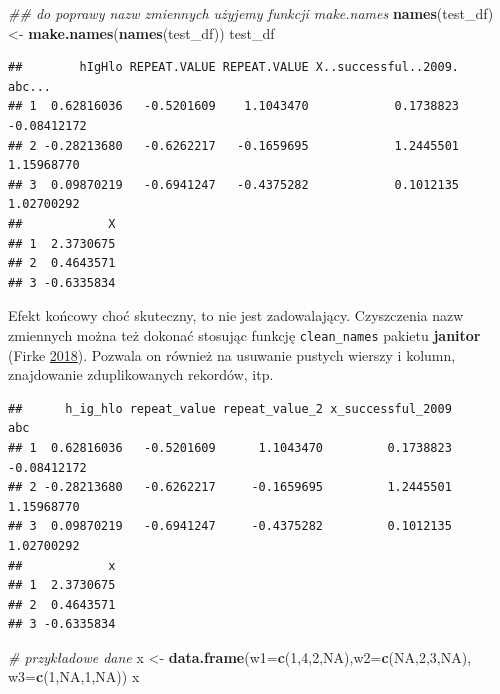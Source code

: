 \documentclass[]{book}
\newenvironment{Shaded}{\begin{snugshade}}{\end{snugshade}}
\newcommand{\CommentTok}[1]{\textcolor[rgb]{0.56,0.35,0.01}{\textit{#1}}}
\newcommand{\DataTypeTok}[1]{\textcolor[rgb]{0.13,0.29,0.53}{#1}}
\newcommand{\DecValTok}[1]{\textcolor[rgb]{0.00,0.00,0.81}{#1}}
\newcommand{\KeywordTok}[1]{\textcolor[rgb]{0.13,0.29,0.53}{\textbf{#1}}}
\newcommand{\NormalTok}[1]{#1}
\newcommand{\OperatorTok}[1]{\textcolor[rgb]{0.81,0.36,0.00}{\textbf{#1}}}
\newcommand{\OtherTok}[1]{\textcolor[rgb]{0.56,0.35,0.01}{#1}}
\newcommand{\StringTok}[1]{\textcolor[rgb]{0.31,0.60,0.02}{#1}}
\theoremstyle{plain}
\theoremstyle{definition}
\theoremstyle{definition}
\theoremstyle{definition}
\theoremstyle{definition}
\theoremstyle{remark}
\begin{document}
\begin{Shaded}
\begin{Highlighting}[]
\CommentTok{## do poprawy nazw zmiennych użyjemy funkcji make.names}
\KeywordTok{names}\NormalTok{(test_df) <-}\StringTok{ }\KeywordTok{make.names}\NormalTok{(}\KeywordTok{names}\NormalTok{(test_df))}
\NormalTok{test_df}
\end{Highlighting}
\end{Shaded}

\begin{verbatim}
##        hIgHlo REPEAT.VALUE REPEAT.VALUE X..successful..2009.      abc...
## 1  0.62816036   -0.5201609    1.1043470            0.1738823 -0.08412172
## 2 -0.28213680   -0.6262217   -0.1659695            1.2445501  1.15968770
## 3  0.09870219   -0.6941247   -0.4375282            0.1012135  1.02700292
##            X
## 1  2.3730675
## 2  0.4643571
## 3 -0.6335834
\end{verbatim}

Efekt końcowy choć skuteczny, to nie jest zadowalający. Czyszczenia nazw zmiennych można też dokonać stosując funkcję \texttt{clean\_names} pakietu \textbf{janitor} (Firke \protect\hyperlink{ref-R-janitor}{2018}). Pozwala on również na usuwanie pustych wierszy i kolumn, znajdowanie zduplikowanych rekordów, itp.

\begin{Shaded}
\end{Shaded}

\begin{verbatim}
##      h_ig_hlo repeat_value repeat_value_2 x_successful_2009         abc
## 1  0.62816036   -0.5201609      1.1043470         0.1738823 -0.08412172
## 2 -0.28213680   -0.6262217     -0.1659695         1.2445501  1.15968770
## 3  0.09870219   -0.6941247     -0.4375282         0.1012135  1.02700292
##            x
## 1  2.3730675
## 2  0.4643571
## 3 -0.6335834
\end{verbatim}

\begin{Shaded}
\begin{Highlighting}[]
\CommentTok{# przykładowe dane}
\NormalTok{x <-}\StringTok{ }\KeywordTok{data.frame}\NormalTok{(}\DataTypeTok{w1=}\KeywordTok{c}\NormalTok{(}\DecValTok{1}\NormalTok{,}\DecValTok{4}\NormalTok{,}\DecValTok{2}\NormalTok{,}\OtherTok{NA}\NormalTok{),}\DataTypeTok{w2=}\KeywordTok{c}\NormalTok{(}\OtherTok{NA}\NormalTok{,}\DecValTok{2}\NormalTok{,}\DecValTok{3}\NormalTok{,}\OtherTok{NA}\NormalTok{), }\DataTypeTok{w3=}\KeywordTok{c}\NormalTok{(}\DecValTok{1}\NormalTok{,}\OtherTok{NA}\NormalTok{,}\DecValTok{1}\NormalTok{,}\OtherTok{NA}\NormalTok{))}
\NormalTok{x}
\end{Highlighting}
\end{Shaded}
\end{document}
